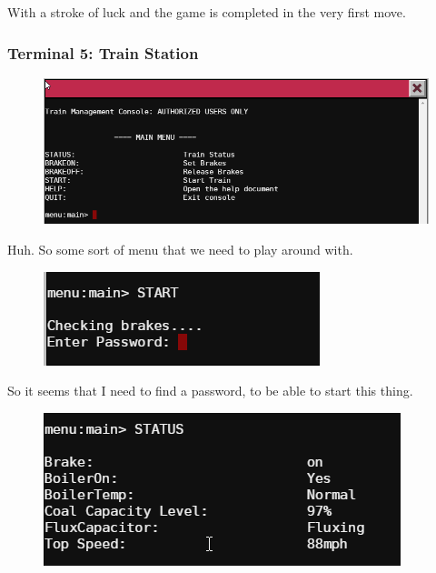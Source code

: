 \documentclass[writeup.tex]{subfiles}
\begin{document}
			With a stroke of luck and the game is completed in the very first move.

		\subsubsection{Terminal 5: Train Station} \label{terminal5}
			\begin{figure}[H]
				\centering
				\includegraphics[width=\linewidth]{"screenshots/terminals/Terminal 5 - First"}
			\end{figure}
			
			Huh. So some sort of menu that we need to play around with.
			
			\begin{figure}[H]
				\centering
				\includegraphics[scale=1]{"screenshots/terminals/Terminal 5 - Start pt1"}
			\end{figure}
			
			So it seems that I need to find a password, to be able to start this thing.	
			
			\begin{figure}[H]
				\centering
				\includegraphics[scale=1]{"screenshots/terminals/Terminal 5 - Status"}
			\end{figure}
			
\end{document}
